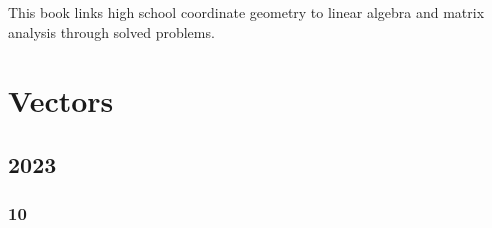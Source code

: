 \documentclass[11pt]{book}
\begin{document}

\setcounter{page}{1}

\begin{introduction}
This book links high school coordinate geometry to linear algebra and matrix analysis through solved problems.

\end{introduction}

\mainmatter
\chapter{Vectors}
\section{2023}
\subsection{10}

\end{document}
